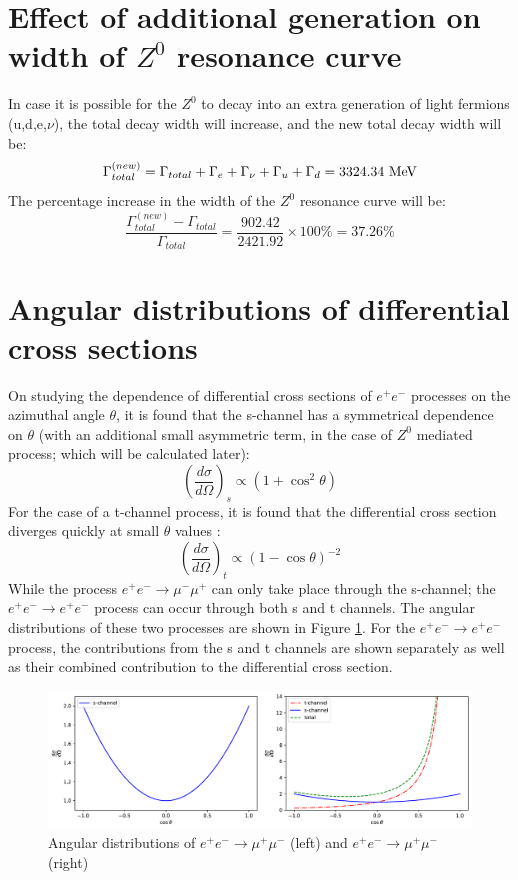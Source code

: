 \section{Effect of additional generation on width of $Z^{0}$ resonance curve}
In case it is possible for the $Z^{0}$ to decay into an extra generation of light fermions (u,d,e,$\nu$), the total decay width will increase, and the new total decay width will be: $$\Gamma_{total}^{(new)}=\Gamma_{total}+\Gamma_{e}+\Gamma_{\nu}+\Gamma_{u}+\Gamma_{d}=3324.34 \ \rm{MeV}$$
The percentage increase in the width of the $Z^{0}$ resonance curve will be: $$\dfrac{\Gamma_{total}^{(new)}-\Gamma_{total}}{\Gamma_{total}}=\dfrac{902.42}{2421.92}\times 100 \% = 37.26 \%$$

\section{Angular distributions of differential cross sections}
On studying the dependence of differential cross sections of $e^{+}e^{-}$ processes on the azimuthal angle $\theta$, it is found that the s-channel has a symmetrical dependence on $\theta$ (with an additional small asymmetric term, in the case of $Z^{0}$ mediated process; which will be calculated later): 
\begin{equation}
\left(\dfrac{d\sigma}{d\Omega}\right)_{s}\propto \left(1+\cos^{2}\theta\right)
\end{equation} 
For the case of a t-channel process, it is found that the differential cross section diverges quickly at small $\theta$ values \cite{UB}:
\begin{equation}
\left(\dfrac{d\sigma}{d\Omega}\right)_{t}\propto \left(1-\cos\theta\right)^{-2}
\end{equation}
While the process $e^{+}e^{-}\rightarrow \mu^{-}\mu^{+}$ can only take place through the s-channel; the $e^{+}e^{-}\rightarrow e^{+}e^{-}$ process can occur through both s and t channels. The angular distributions of these two processes are shown in Figure \ref{angdist}. For the $e^{+}e^{-}\rightarrow e^{+}e^{-}$ process, the contributions from the s and t channels are shown separately as well as their combined contribution to the differential cross section.
\begin{figure}[h]
\includegraphics[width=\textwidth]{angulardist.pdf}
\caption[Angular distributions of $e^{+}e^{-}\rightarrow \mu^{+}\mu^{-}$ and $e^{+}e^{-}\rightarrow \mu^{+}\mu^{-}$]{Angular distributions of $e^{+}e^{-}\rightarrow \mu^{+}\mu^{-}$ (left) and $e^{+}e^{-}\rightarrow \mu^{+}\mu^{-}$ (right)}
\label{angdist}
\end{figure}

